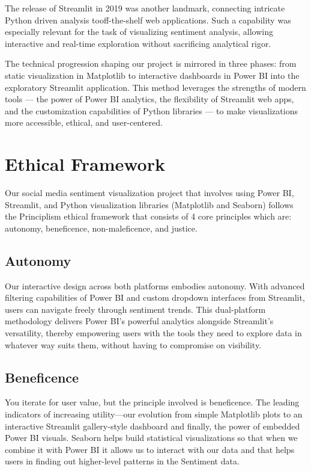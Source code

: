 \documentclass[conference]{IEEEtran}
\begin{document}
The release of Streamlit in 2019 was another landmark, connecting intricate Python driven analysis tooff-the-shelf web applications. Such a capability was especially relevant for the task of visualizing sentiment analysis, allowing interactive and real-time exploration without sacrificing analytical rigor.

The technical progression shaping our project is mirrored in three phases: from static visualization in Matplotlib to interactive dashboards in Power BI into the exploratory Streamlit application. This method leverages the strengths of modern tools — the power of Power BI analytics, the flexibility of Streamlit web apps, and the customization capabilities of Python libraries — to make visualizations more accessible, ethical, and user-centered.

\section{Ethical Framework}

Our social media sentiment visualization project that involves using Power BI, Streamlit, and Python visualization libraries (Matplotlib and Seaborn) follows the Principlism ethical framework that consists of 4 core principles which are: autonomy, beneficence, non-maleficence, and justice.

\subsection{Autonomy}

Our interactive design across both platforms embodies autonomy. With advanced filtering capabilities of Power BI and custom dropdown interfaces from Streamlit, users can navigate freely through sentiment trends. This dual-platform methodology delivers Power BI's powerful analytics alongside Streamlit's versatility, thereby empowering users with the tools they need to explore data in whatever way suits them, without having to compromise on visibility.
\subsection{Beneficence}
You iterate for user value, but the principle involved is beneficence. The leading indicators of increasing utility—our evolution from simple Matplotlib plots to an interactive Streamlit gallery-style dashboard and finally, the power of embedded Power BI visuals. Seaborn helps build statistical visualizations so that when we combine it with Power BI it allows us to interact with our data and that helps users in finding out higher-level patterns in the Sentiment data.
\end{document}
